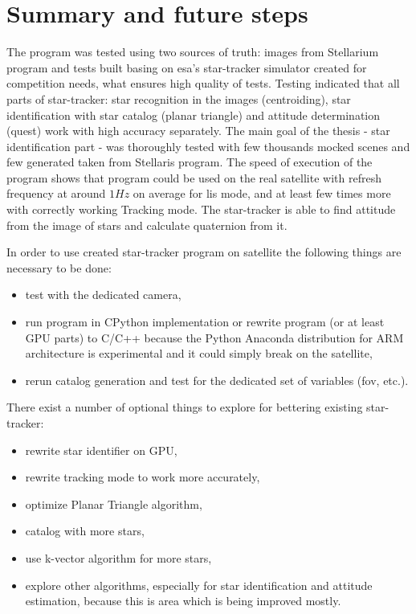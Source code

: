 \documentclass[12pt,a4paper,twoside]{article}
\begin{document}
\newpage
\section{Summary and future steps}

The program was tested using two sources of truth: images from Stellarium program and tests built basing on \gls{esa}'s star-tracker simulator created for competition needs, what ensures high quality of tests. Testing indicated that all parts of star-tracker: star recognition in the images (centroiding), star identification with star catalog (planar triangle) and attitude determination (\gls{quest}) work with high accuracy separately. The main goal of the thesis - star identification part - was thoroughly tested with few thousands mocked  scenes and few generated taken from Stellaris program. The speed of execution of the program shows that program could be used on the real satellite with refresh frequency at around $1Hz$ on average for \gls{lis} mode, and at least few times more with correctly working Tracking mode. The star-tracker is able to find attitude from the image of stars and calculate quaternion from it.

In order to use created star-tracker program on satellite the following things are necessary to be done:
\begin{itemize}
\item test with the dedicated camera,
\item run program in CPython implementation or rewrite program (or at least GPU parts) to C/C++ because the Python Anaconda distribution for ARM architecture is experimental and it could simply break on the satellite,
\item rerun catalog generation and test for the dedicated set of variables (\gls{fov}, etc.).
\end{itemize}

There exist a number of optional things to explore for bettering existing star-tracker:
\begin{itemize}
\item rewrite star identifier on GPU,
\item rewrite tracking mode to work more accurately,
\item optimize Planar Triangle algorithm,
\item catalog with more stars,
\item use k-vector algorithm for more stars,
\item explore other algorithms, especially for star identification and attitude estimation, because this is area which is being improved mostly.
\end{itemize}
\end{document}
